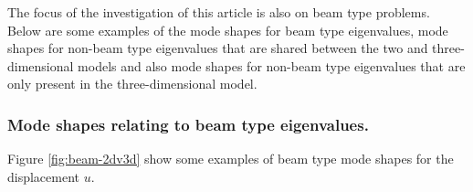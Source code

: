 The focus of the investigation of this article is also on beam type problems. Below are some examples of the mode shapes for beam type eigenvalues, mode shapes for non-beam type eigenvalues that are shared between the two and three-dimensional models and also mode shapes for non-beam type eigenvalues that are only present in the three-dimensional model.

\subsubsection{Mode shapes relating to beam type eigenvalues.}
Figure \ref{fig:beam-2dv3d} show some examples of beam type mode shapes for the displacement $u$.

\begin{figure}[h!]
\end{figure}
